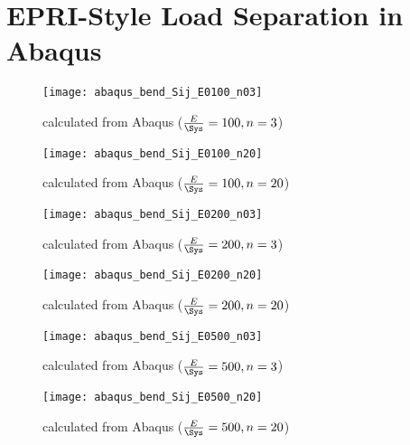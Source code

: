 \chapter{EPRI-Style Load Separation in Abaqus} \label{chap:load-separation-epri}



\begin{figure}[tbp]
\centering
\texttt{[image: abaqus\_bend\_Sij\_E0100\_n03]}
\caption{\Sij calculated from Abaqus (\(\frac{E}{\Sys}=100, n=3\))\label{fig:abaqus_Sij_E0100_n03}}
\end{figure}

\begin{figure}[tbp]
\centering
\texttt{[image: abaqus\_bend\_Sij\_E0100\_n20]}
\caption{\Sij calculated from Abaqus (\(\frac{E}{\Sys}=100, n=20\))\label{fig:abaqus_Sij_E0100_n20}}
\end{figure}

\begin{figure}[tbp]
\centering
\texttt{[image: abaqus\_bend\_Sij\_E0200\_n03]}
\caption{\Sij calculated from Abaqus (\(\frac{E}{\Sys}=200, n=3\))\label{fig:abaqus_Sij_E0200_n03}}
\end{figure}

\begin{figure}[tbp]
\centering
\texttt{[image: abaqus\_bend\_Sij\_E0200\_n20]}
\caption{\Sij calculated from Abaqus (\(\frac{E}{\Sys}=200, n=20\))\label{fig:abaqus_Sij_E0200_n20}}
\end{figure}

\begin{figure}[tbp]
\centering
\texttt{[image: abaqus\_bend\_Sij\_E0500\_n03]}
\caption{\Sij calculated from Abaqus (\(\frac{E}{\Sys}=500, n=3\))\label{fig:abaqus_Sij_E0500_n03}}
\end{figure}

\begin{figure}[tbp]
\centering
\texttt{[image: abaqus\_bend\_Sij\_E0500\_n20]}
\caption{\Sij calculated from Abaqus (\(\frac{E}{\Sys}=500, n=20\))\label{fig:abaqus_Sij_E0500_n20}}
\end{figure}

